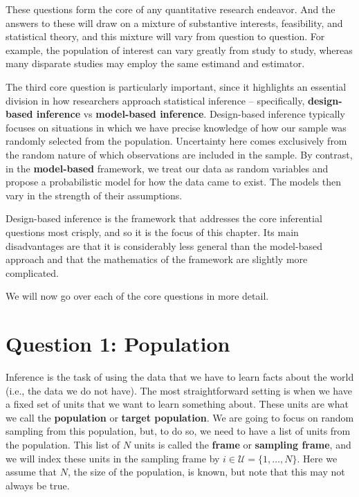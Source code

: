 \documentclass[
  letterpaper,
  DIV=11,
  numbers=noendperiod]{scrreprt}
\theoremstyle{plain}
\theoremstyle{definition}
\theoremstyle{definition}
\theoremstyle{remark}
\begin{document}
These questions form the core of any quantitative research endeavor. And
the answers to these will draw on a mixture of substantive interests,
feasibility, and statistical theory, and this mixture will vary from
question to question. For example, the population of interest can vary
greatly from study to study, whereas many disparate studies may employ
the same estimand and estimator.

The third core question is particularly important, since it highlights
an essential division in how researchers approach statistical inference
-- specifically, \textbf{design-based inference} vs \textbf{model-based
inference}. Design-based inference typically focuses on situations in
which we have precise knowledge of how our sample was randomly selected
from the population. Uncertainty here comes exclusively from the random
nature of which observations are included in the sample. By contrast, in
the \textbf{model-based} framework, we treat our data as random
variables and propose a probabilistic model for how the data came to
exist. The models then vary in the strength of their assumptions.

Design-based inference is the framework that addresses the core
inferential questions most crisply, and so it is the focus of this
chapter. Its main disadvantages are that it is considerably less general
than the model-based approach and that the mathematics of the framework
are slightly more complicated.

We will now go over each of the core questions in more detail.

\hypertarget{question-1-population}{%
\section{Question 1: Population}\label{question-1-population}}

Inference is the task of using the data that we have to learn facts
about the world (i.e., the data we do not have). The most
straightforward setting is when we have a fixed set of units that we
want to learn something about. These units are what we call the
\textbf{population} or \textbf{target population}. We are going to focus
on random sampling from this population, but, to do so, we need to have
a list of units from the population. This list of \(N\) units is called
the \textbf{frame} or \textbf{sampling frame}, and we will index these
units in the sampling frame by \(i \in \mathcal{U} = \{1, \ldots, N\}\).
Here we assume that \(N\), the size of the population, is known, but
note that this may not always be true.
\end{document}
